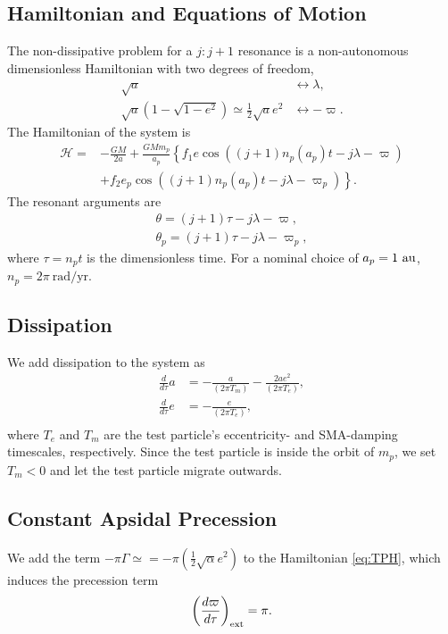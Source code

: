 \documentclass[usenatbib,twocolumn]{mnras}
\begin{document}
\subsection{Hamiltonian and Equations of Motion}
The non-dissipative problem for a $j:j+1$ resonance is a non-autonomous dimensionless Hamiltonian with two degrees of freedom,
\begin{align}
    \sqrt{a} &\longleftrightarrow \lambda,\\
    \sqrt{a}(1-\sqrt{1-e^2})\simeq \frac12\sqrt{a}e^2&\longleftrightarrow -\varpi.
\end{align}
The Hamiltonian of the system is 
\begin{align}
    \label{eq:TPH}
    \mathcal H=&-\frac{GM}{2a}
    +\frac{GMm_p}{a_p}\left\{
        f_1e\cos((j+1)n_p(a_p)t-j\lambda-\varpi)\right.\\
        &\left. +f_2e_p\cos((j+1)n_p(a_p)t-j\lambda-\varpi_p)
    \right\}.\nonumber
\end{align}
The resonant arguments are 
\begin{align}
    \theta=(j+1)\tau -j\lambda-\varpi,\\
    \theta_p=(j+1)\tau -j\lambda-\varpi_p,
\end{align}
where $\tau=n_p t$ is the dimensionless time. For a nominal choice of $a_p=1~\rm{au}$, $n_p = 2\pi~\mathrm{rad}/\mathrm{yr}$.

\subsection{Dissipation}
We add dissipation to the system as
\begin{align}
 \frac{d}{d\tau} a&=- \frac{a}{(2\pi T_{m})} - \frac{2 a e^{2}}{(2\pi T_{e})},\\
 \frac{d}{d\tau} e&=- \frac{e}{(2\pi T_{e})},\\
\end{align}
where $T_e$ and $T_m$ are the test particle's eccentricity- and SMA-damping timescales, respectively. Since the test particle is inside the orbit of $m_p$, we set $T_m<0$ and let the test particle migrate outwards.


\subsection{Constant Apsidal Precession}
\label{sec:}
We add the term $-\pi\Gamma\simeq = -\pi\left(\frac12\sqrt{\alpha}e^2\right)$ to the Hamiltonian \ref{eq:TPH}, which induces the precession term
\begin{equation}
    \left(\frac{d\varpi}{d\tau}\right)_{\rm ext} = \pi.
\end{equation}
\end{document}
